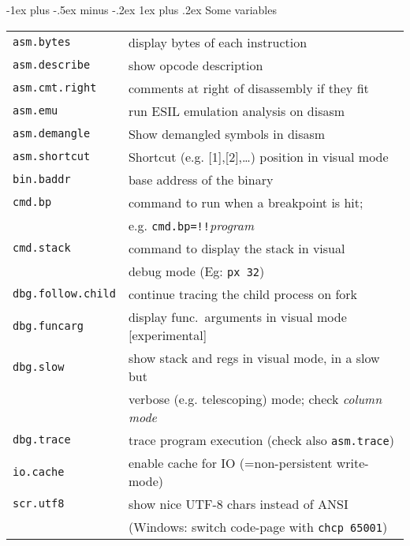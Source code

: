 \documentclass[a4paper,landscape]{article}
\makeatletter
\renewcommand{\subsubsection}{\@startsection{subsubsection}{3}{0mm}%
                                {-1ex plus -.5ex minus -.2ex}%
                                {1ex plus .2ex}%
                                {\normalfont\small\bfseries}}
\makeatother
\begin{document}
\begin{multicols*}{3}
\subsubsection{Some variables}
\begin{tabular}{@{}ll@{}}
\texttt{asm.bytes} & display bytes of each instruction \\
\texttt{asm.describe} & show opcode description \\
\texttt{asm.cmt.right} & comments at right of disassembly if they fit \\
\texttt{asm.emu} & run ESIL emulation analysis on disasm \\
\texttt{asm.demangle} & Show demangled symbols in disasm \\
\texttt{asm.shortcut} & Shortcut (e.g. [1],[2],\ldots) position in visual mode \\
\texttt{bin.baddr} & base address of the binary \\
\texttt{cmd.bp} & command to run when a breakpoint is hit; \\ & e.g. \texttt{cmd.bp=!!}\textit{program} \\
\texttt{cmd.stack} & command to display the stack in visual \\ & debug mode (Eg: \texttt{px 32}) \\
\texttt{dbg.follow.child} & continue tracing the child process on fork \\
\texttt{dbg.funcarg} & display func.~arguments in visual mode [experimental]\\
\texttt{dbg.slow} & show stack and regs in visual mode, in a slow but \\ & verbose (e.g. telescoping) mode; check \emph{column mode} \\
\texttt{dbg.trace} & trace program execution (check also \texttt{asm.trace}) \\
\texttt{io.cache} & enable cache for IO (=non-persistent write-mode) \\
\texttt{scr.utf8} & show nice UTF-8 chars instead of ANSI \\ & (Windows: switch code-page with \texttt{chcp 65001})\\

\end{tabular}
\end{multicols*}
\end{document}
